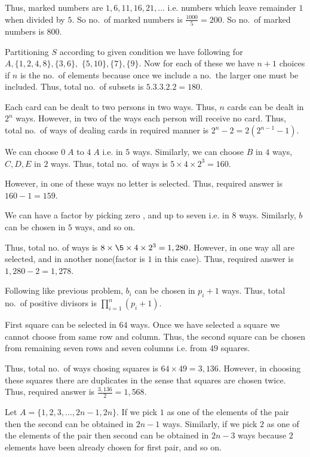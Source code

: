   Thus, marked numbers are $1, 6, 11, 16, 21, \ldots$ i.e. numbers which leave remainder $1$ when divided by
  $5$. So no.\ of marked numbers is $\frac{1000}{5} = 200$. So no.\ of marked numbers is $800$.
\item Partitioning $S$ according to given condition we have following for $A, \{1, 2, 4, 8\}, \{3, 6\},$ $\{5,
  10\}, \{7\}, \{9\}$. Now for each of these we have $n + 1$ choices if $n$ is the no.\ of elements because
  once we include a no.\ the larger one must be included. Thus, total no.\ of subsets is $5.3.3.2.2 = 180$.
\item Each card can be dealt to two persons in two ways. Thus, $n$ cards can be dealt in $2^n$
  ways. However, in two of the ways each person will receive no card. Thus, total no.\ of ways of dealing
  cards in required manner is $2^n - 2 = 2(2^{n - 1} - 1)$.
\item We can choose $0\;A$ to $4\;A$ i.e. in $5$ ways. Similarly, we can choose $B$ in $4$ ways, $C, D, E$ in
  $2$ ways. Thus, total no.\ of ways is $5\times4\times2^3 = 160$.

  However, in one of these ways no letter is selected. Thus, required answer is $160 - 1 = 159$.
\item We can have a factor by picking zero , and up to seven  i.e. in $8$ ways. Similarly,
  $b$ can be chosen in $5$ ways, and so on.

  Thus, total no. of ways is $8\times\5\times4\times2^3 = 1,280$. However, in one way all are selected, and in
  another none(factor is $1$ in this case). Thus, required answer is $1,280 - 2 = 1,278$.
\item Following like previous problem, $b_i$ can be chosen in $p_i + 1$ ways.
  Thus, total no.\ of positive divisors is $\displaystyle\prod_{i = 1}^n(p_i + 1)$.
\item First square can be selected in $64$ ways. Once we have selected a square we cannot choose from same
  row and column. Thus, the second square can be chosen from remaining seven rows and seven columns
  i.e. from $49$ squares.

  Thus, total no.\ of ways chosing squares is $64\times 49 = 3,136$. However, in choosing these squares there are
  duplicates in the sense that squares are chosen twice. Thus, required answer is $\frac{3,136}{2} = 1,568$.
\item Let $A = \{1, 2, 3, \ldots, 2n - 1, 2n\}$. If we pick $1$ as one of the elements of the pair then the
  second can be obtained in $2n - 1$ ways. Similarly, if we pick $2$ as one of the elements of the pair then
  second can be obtained in $2n - 3$ ways because $2$ elements have been already chosen for first pair, and
  so on.

